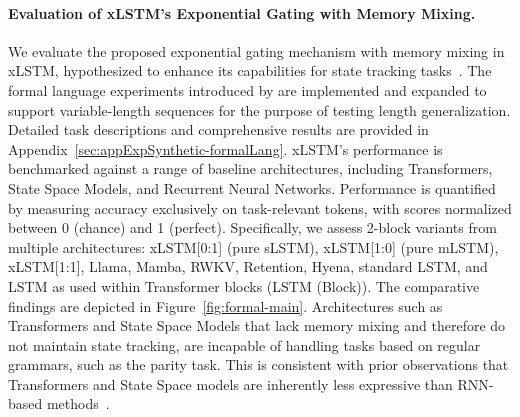 \paragraph{Evaluation of xLSTM’s Exponential Gating with Memory Mixing.} We evaluate the proposed exponential gating mechanism with memory mixing in xLSTM, hypothesized to enhance its capabilities for state tracking tasks~\citep{Merrill:24, Merrill:23}. The formal language experiments introduced by \citet{Deletang:23} are implemented and expanded to support variable-length sequences for the purpose of testing length generalization. Detailed task descriptions and comprehensive results are provided in Appendix~\ref{sec:appExpSynthetic-formalLang}. xLSTM’s performance is benchmarked against a range of baseline architectures, including Transformers, State Space Models, and Recurrent Neural Networks. Performance is quantified by measuring accuracy exclusively on task-relevant tokens, with scores normalized between 0 (chance) and 1 (perfect). Specifically, we assess 2-block variants from multiple architectures: xLSTM[0:1] (pure sLSTM), xLSTM[1:0] (pure mLSTM), xLSTM[1:1], Llama, Mamba, RWKV, Retention, Hyena, standard LSTM, and LSTM as used within Transformer blocks (LSTM (Block)). The comparative findings are depicted in Figure~\ref{fig:formal-main}. Architectures such as Transformers and State Space Models that lack memory mixing and therefore do not maintain state tracking, are incapable of handling tasks based on regular grammars, such as the parity task. This is consistent with prior observations that Transformers and State Space models are inherently less expressive than RNN-based methods~\citep{Merrill:24, Merrill:23, Deletang:23}.

